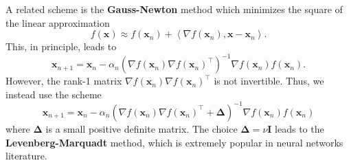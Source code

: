 A related scheme is the \textbf{Gauss-Newton} method which minimizes the square of the linear approximation
\[
    f(\mathbf{x}) \approx f(\mathbf{x}_n) + \left\langle \nabla f(\mathbf{x}_n), \mathbf{x} - \mathbf{x}_n \right\rangle. 
\]
This, in principle, leads to
\[
    \mathbf{x}_{n+1} = \mathbf{x}_n - \alpha_n \left( \nabla f(\mathbf{x}_n) \nabla f(\mathbf{x}_n)^{\top} \right)^{-1} \nabla f(\mathbf{x}_n) f(\mathbf{x}_n). 
\]
However, the rank-1 matrix $\nabla f(\mathbf{x}_n) \nabla f(\mathbf{x}_n)^{\top}$ is not invertible. Thus, we instead use the scheme
\[
    \mathbf{x}_{n+1} = \mathbf{x}_n - \alpha_n \left( \nabla f(\mathbf{x}_n) \nabla f(\mathbf{x}_n)^{\top} + \bm{\Delta} \right)^{-1} \nabla f(\mathbf{x}_n) f(\mathbf{x}_n)
\]
where $\bm{\Delta}$ is a small positive definite matrix. The choice $\bm{\Delta} = \nu \mathbf{I}$ leads to the \textbf{Levenberg-Marquadt} method, which is extremely popular in neural networks literature. 